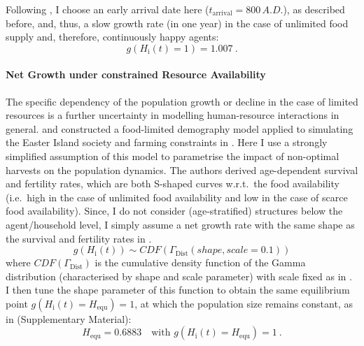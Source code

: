 Following \citet{Bahn2017}, I choose an early arrival date here ($t_\text{arrival}=800\, A.D.$), as described before, and, thus, a slow growth rate (in one year) in the case of unlimited food supply and, therefore, continuously happy agents: 
\begin{equation}
	g(H_\text{i}(t)=1) = 1.007 \ .
\end{equation}

\paragraph{Net Growth under constrained Resource Availability}
The specific dependency of the population growth or decline in the case of limited resources is a further uncertainty in modelling human-resource interactions in general.
\citet{Lee2008} and \citet{Puleston2008} constructed a food-limited demography model applied to simulating the Easter Island society and farming constraints in \citet{Puleston2017}. 
Here I use a strongly simplified assumption of this model to parametrise the impact of non-optimal harvests on the population dynamics. 
The authors derived age-dependent survival and fertility rates, which are both S-shaped curves w.r.t.\ the food availability (i.e.\ high in the case of unlimited food availability and low in the case of scarce food availability).
Since, I do not consider (age-stratified) structures below the agent/household level, I simply assume a net growth rate with the same shape as the survival and fertility rates in \citet{Lee2008}.
\begin{equation}
g(H_\text{i}(t)) \sim CDF(\Gamma_\text{Dist}(shape, scale=0.1))
\end{equation}
where $CDF(\Gamma_\text{Dist})$ is the cumulative density function of the Gamma distribution (characterised by shape and scale parameter) with scale fixed as in \citet{Lee2008}.
I then tune the shape parameter of this function to obtain the same equilibrium point $g(H_\text{i}(t) =H_\text{equ})=1$, at which the population size remains constant, as in \citet{Puleston2017} (Supplementary Material):
\begin{equation}
H_\text{equ}=0.6883 \quad \text{with } g(H_\text{i}(t) = H_\text{equ})=1   \ .
\end{equation} 
